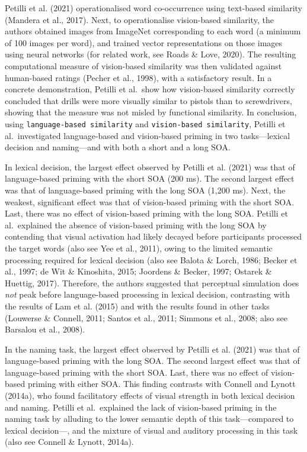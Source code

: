 \documentclass[
  12pt,
  man,floatsintext]{apa7}
\begin{document}
Petilli et al. (2021) operationalised word co-occurrence using text-based similarity (Mandera et al., 2017). Next, to operationalise vision-based similarity, the authors obtained images from ImageNet corresponding to each word (a minimum of 100 images per word), and trained vector representations on those images using neural networks (for related work, see Roads \& Love, 2020). The resulting computational measure of vision-based similarity was then validated against human-based ratings (Pecher et al., 1998), with a satisfactory result. In a concrete demonstration, Petilli et al.~show how vision-based similarity correctly concluded that drills were more visually similar to pistols than to screwdrivers, showing that the measure was not misled by functional similarity. In conclusion, using \texttt{language-based\ similarity} and \texttt{vision-based\ similarity}, Petilli et al.~investigated language-based and vision-based priming in two tasks---lexical decision and naming---and with both a short and a long SOA.

In lexical decision, the largest effect observed by Petilli et al. (2021) was that of language-based priming with the short SOA (200 ms). The second largest effect was that of language-based priming with the long SOA (1,200 ms). Next, the weakest, significant effect was that of vision-based priming with the short SOA. Last, there was no effect of vision-based priming with the long SOA. Petilli et al.~explained the absence of vision-based priming with the long SOA by contending that visual activation had likely decayed before participants processed the target words (also see Yee et al., 2011), owing to the limited semantic processing required for lexical decision (also see Balota \& Lorch, 1986; Becker et al., 1997; de Wit \& Kinoshita, 2015; Joordens \& Becker, 1997; Ostarek \& Huettig, 2017). Therefore, the authors suggested that perceptual simulation does \emph{not} peak before language-based processing in lexical decision, contrasting with the results of Lam et al. (2015) and with the results found in other tasks (Louwerse \& Connell, 2011; Santos et al., 2011; Simmons et al., 2008; also see Barsalou et al., 2008).

In the naming task, the largest effect observed by Petilli et al. (2021) was that of language-based priming with the long SOA. The second largest effect was that of language-based priming with the short SOA. Last, there was no effect of vision-based priming with either SOA. This finding contrasts with Connell and Lynott (2014a), who found facilitatory effects of visual strength in both lexical decision and naming. Petilli et al.~explained the lack of vision-based priming in the naming task by alluding to the lower semantic depth of this task---compared to lexical decision---, and the mixture of visual and auditory processing in this task (also see Connell \& Lynott, 2014a).
\end{document}
